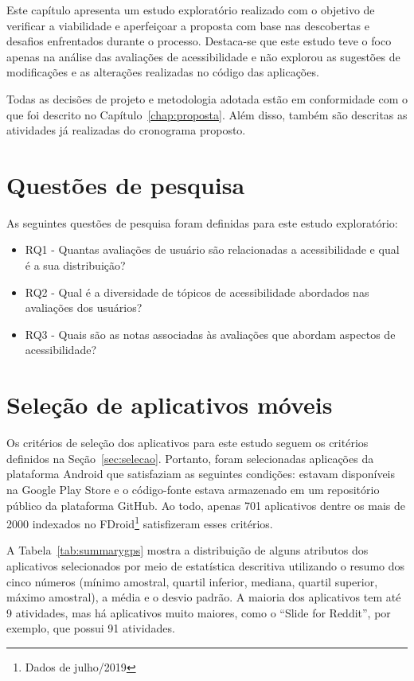 Este capítulo apresenta um estudo exploratório realizado com o objetivo de verificar a viabilidade e aperfeiçoar a proposta com base nas descobertas e desafios enfrentados durante o processo. Destaca-se que este estudo teve o foco apenas na análise das avaliações de acessibilidade e não explorou as sugestões de modificações e as alterações realizadas no código das aplicações. 


Todas as decisões de projeto e metodologia adotada estão em conformidade com o que foi descrito no Capítulo~\ref{chap:proposta}.
Além disso, também são descritas as atividades já realizadas do cronograma proposto.

\section{Questões de pesquisa}

As seguintes questões de pesquisa foram definidas para este estudo exploratório:
\begin{itemize}
 \item RQ1 - Quantas avaliações de usuário são relacionadas a acessibilidade e qual é a sua distribuição? 
 \item RQ2 - Qual é a diversidade de tópicos de acessibilidade abordados nas avaliações dos usuários?
 \item RQ3 - Quais são as notas associadas às avaliações que abordam aspectos de acessibilidade?  
\end{itemize}

\section{Seleção de aplicativos móveis}

Os critérios de seleção dos aplicativos para este estudo seguem os critérios definidos na Seção~\ref{sec:selecao}. Portanto, foram selecionadas aplicações da plataforma Android que satisfaziam as seguintes condições: estavam disponíveis na Google Play Store e o código-fonte estava armazenado em um repositório público da plataforma GitHub. Ao todo, apenas 701 aplicativos dentre os mais de 2000  indexados no FDroid\footnote{Dados de julho/2019} satisfizeram esses critérios.

A Tabela~\ref{tab:summarygps} mostra a distribuição de alguns atributos dos aplicativos selecionados por meio de estatística descritiva utilizando o resumo dos cinco números (mínimo amostral, quartil inferior, 
mediana, quartil superior, máximo amostral), a média e o desvio padrão. 
A maioria dos aplicativos tem até 9 atividades, mas há aplicativos muito maiores, como o ``Slide for Reddit'', por exemplo, que possui 91 atividades.

